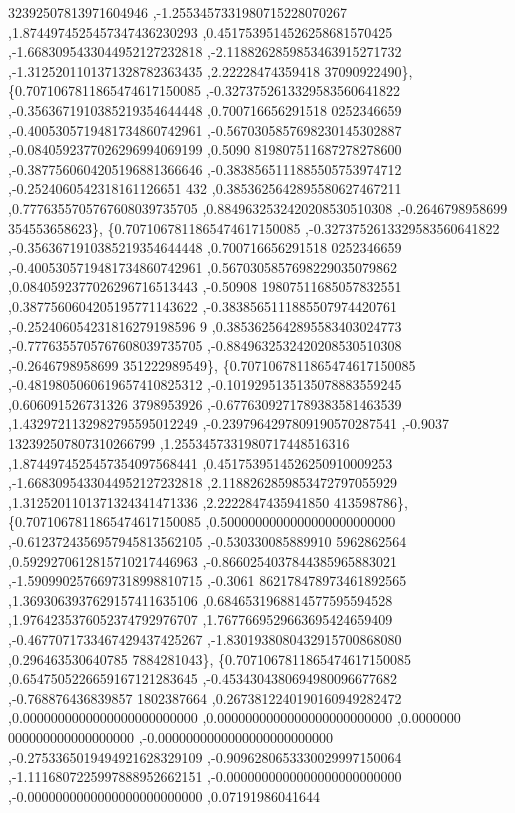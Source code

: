 \begin{DoxyCode}
      32392507813971604946 ,-1.2553457331980715228070267 ,1.8744974525457347436230293 ,0.4517539514526258681570425
       ,-1.6683095433044952127232818 ,-2.1188262859853463915271732 ,-1.3125201101371328782363435 ,2.22228474359418
      37090922490\},
\{0.7071067811865474617150085 ,-0.3273752613329583560641822 ,-0.3563671910385219354644448 ,0.700716656291518
      0252346659 ,-0.4005305719481734860742961 ,-0.5670305857698230145302887 ,-0.0840592377026296994069199 ,0.5090
      819807511687278278600 ,-0.3877560604205196881366646 ,-0.3838565111885505753974712 ,-0.2524060542318161126651
      432 ,0.3853625642895580627467211 ,0.7776355705767608039735705 ,0.8849632532420208530510308 ,-0.2646798958699
      354553658623\},
\{0.7071067811865474617150085 ,-0.3273752613329583560641822 ,-0.3563671910385219354644448 ,0.700716656291518
      0252346659 ,-0.4005305719481734860742961 ,0.5670305857698229035079862 ,0.0840592377026296716513443 ,-0.50908
      19807511685057832551 ,0.3877560604205195771143622 ,-0.3838565111885507974420761 ,-0.252406054231816279198596
      9 ,0.3853625642895583403024773 ,-0.7776355705767608039735705 ,-0.8849632532420208530510308 ,-0.2646798958699
      351222989549\},
\{0.7071067811865474617150085 ,-0.4819805060619657410825312 ,-0.1019295135135078883559245 ,0.606091526731326
      3798953926 ,-0.6776309271789383581463539 ,1.4329721132982795595012249 ,-0.2397964297809190570287541 ,-0.9037
      132392507807310266799 ,1.2553457331980717448516316 ,1.8744974525457354097568441 ,0.4517539514526250910009253
       ,-1.6683095433044952127232818 ,2.1188262859853472797055929 ,1.3125201101371324341471336 ,2.2222847435941850
      413598786\},
\{0.7071067811865474617150085 ,0.5000000000000000000000000 ,-0.6123724356957945813562105 ,-0.530330085889910
      5962862564 ,0.5929270612815710217446963 ,-0.8660254037844385965883021 ,-1.5909902576697318998810715 ,-0.3061
      862178478973461892565 ,1.3693063937629157411635106 ,0.6846531968814577595594528 ,1.9764235376052374792976707
       ,1.7677669529663695424659409 ,-0.4677071733467429437425267 ,-1.8301938080432915700868080 ,0.296463530640785
      7884281043\},
\{0.7071067811865474617150085 ,0.6547505226659167121283645 ,-0.4534304380694980096677682 ,-0.768876436839857
      1802387664 ,0.2673812240190160949282472 ,0.0000000000000000000000000 ,0.0000000000000000000000000 ,0.0000000
      000000000000000000 ,-0.0000000000000000000000000 ,-0.2753365019494921628329109 ,-0.9096280653330029997150064
       ,-1.1116807225997888952662151 ,-0.0000000000000000000000000 ,-0.0000000000000000000000000 ,0.07191986041644

\end{DoxyCode}
